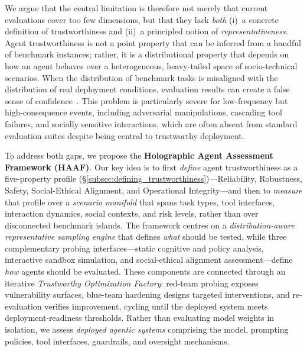 We argue that the central limitation is therefore not merely that current evaluations cover too few dimensions, but that they lack \emph{both} (i)~a concrete definition of trustworthiness and (ii)~a principled notion of \emph{representativeness}. Agent trustworthiness is not a point property that can be inferred from a handful of benchmark instances; rather, it is a distributional property that depends on how an agent behaves over a heterogeneous, heavy-tailed space of socio-technical scenarios. When the distribution of benchmark tasks is misaligned with the distribution of real deployment conditions, evaluation results can create a false sense of confidence~\cite{koh2021wilds,shirali2022dynamicbench}. This problem is particularly severe for low-frequency but high-consequence events, including adversarial manipulations, cascading tool failures, and socially sensitive interactions, which are often absent from standard evaluation suites despite being central to trustworthy deployment.

To address both gaps, we propose the \textbf{Holographic Agent Assessment Framework (HAAF)}.
Our key idea is to first \emph{define} agent trustworthiness as a five-property profile (\S\ref{subsec:defining_trustworthiness})---Reliability, Robustness, Safety, Social-Ethical Alignment, and Operational Integrity---and then to \emph{measure} that profile over a \emph{scenario manifold} that spans task types, tool interfaces, interaction dynamics, social contexts, and risk levels, rather than over disconnected benchmark islands. The framework centres on a \emph{distribution-aware representative sampling engine} that defines \emph{what} should be tested, while three complementary probing interfaces---static cognitive and policy analysis, interactive sandbox simulation, and social-ethical alignment assessment---define \emph{how} agents should be evaluated. These components are connected through an iterative \emph{Trustworthy Optimization Factory}: red-team probing exposes vulnerability surfaces, blue-team hardening designs targeted interventions, and re-evaluation verifies improvement, cycling until the deployed system meets deployment-readiness thresholds. Rather than evaluating model weights in isolation, we assess \emph{deployed agentic systems} comprising the model, prompting policies, tool interfaces, guardrails, and oversight mechanisms.

